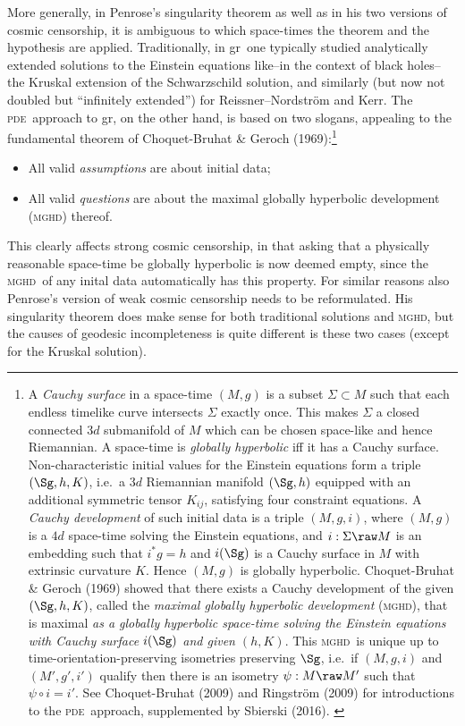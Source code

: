\documentclass[12pt]{article}
\newcommand{\mghd}{\textsc{mghd}}
\newcommand{\pde}{\textsc{pde}}
\newcommand{\GR}{{\sc gr}}
\begin{document}
More generally, in Penrose's singularity theorem as well as in his two versions of cosmic censorship, 
  it is ambiguous to which space-times the theorem and the hypothesis are applied. Traditionally, in  \GR\ one typically studied
analytically extended solutions to the Einstein equations like--in the context of black holes--the Kruskal extension of the Schwarzschild solution, and similarly (but now not doubled but ``infinitely extended'') for  Reissner--Nordstr\"{o}m and Kerr.
 The  \pde\ approach to \GR, on the other hand,  is based on two slogans, appealing to the fundamental theorem of Choquet-Bruhat \& Geroch (1969):\footnote{A \emph{Cauchy surface} in a space-time $(M,g)$ is a subset $\Sigma\subset M$ such that each endless timelike curve intersects $\Sigma$  exactly once. This makes $\Sigma$ a closed connected $3d$ submanifold of $M$ which can  be chosen space-like and hence Riemannian. 
 A space-time is \emph{globally hyperbolic} iff it has a Cauchy surface. 
 Non-characteristic initial values for the Einstein equations form a triple $(\Sg,h,K)$, i.e.\  a $3d$
 Riemannian manifold  $(\Sg,h)$ equipped with an additional symmetric tensor  $K_{ij}$, satisfying four constraint equations.
 A \emph{Cauchy development} of such initial data is a triple $(M,g,i)$,  where $(M,g)$ is a $4d$ space-time solving the Einstein equations, and $i:\Sigma\raw M$ is an embedding such that $i^*g=h$ and $i(\Sg)$ is a Cauchy surface in $M$ with  extrinsic curvature  $K$. Hence $(M,g)$ is globally hyperbolic.  Choquet-Bruhat \& Geroch (1969) showed that 
 there exists a  Cauchy development of the given $(\Sg,h,K)$, called the
 \emph{maximal  globally hyperbolic development} (\mghd), that is maximal \emph{as a globally hyperbolic space-time solving the  Einstein equations with Cauchy surface $i(\Sg)$ and given  $(h,K)$}. This \mghd\ is unique up to time-orientation-preserving isometries preserving $\Sg$, i.e.\ if $(M,g,i)$ and $(M',g',i')$ qualify then there is an isometry $\psi:M\raw M'$ such that $\psi\circ i=i'$. See Choquet-Bruhat (2009) and Ringstr\"{o}m (2009) for introductions to the \pde\ approach, supplemented by Sbierski (2016). 
 \label{CGBfn}
 }
\begin{itemize}
\item All valid \emph{assumptions} are  about  initial data;
\item All valid \emph{questions} are  about the maximal  globally hyperbolic development (\mghd) thereof. 
\end{itemize}
This clearly affects strong cosmic censorship, in that  asking that a physically reasonable space-time be globally hyperbolic is now deemed empty,
 since the \mghd\ of any inital data automatically has this property.  
For similar reasons also Penrose's version of weak cosmic censorship needs to be reformulated. His singularity theorem does make sense for both traditional solutions and \mghd, but the causes of geodesic incompleteness is quite different is these two cases (except for the Kruskal solution).
\end{document}
